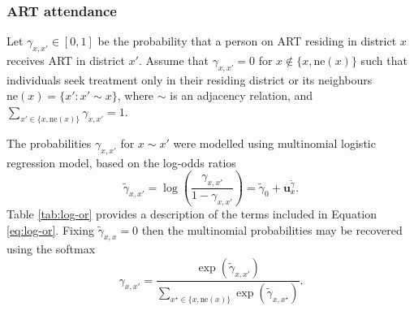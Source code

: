 \documentclass[a4paper, nobind]{templates/ociamthesis}
\begin{document}
\hypertarget{art-attend}{%
\subsubsection{ART attendance}\label{art-attend}}

Let \(\gamma_{x, x'} \in [0, 1]\) be the probability that a person on ART residing in district \(x\) receives ART in district \(x'\).
Assume that \(\gamma_{x, x'} = 0\) for \(x \notin \{x, \text{ne}(x)\}\) such that individuals seek treatment only in their residing district or its neighbours \(\text{ne}(x) = \{x': x' \sim x\}\), where \(\sim\) is an adjacency relation, and \(\sum_{x' \in \{x, \text{ne}(x)\}} \gamma_{x, x'} = 1\).

The probabilities \(\gamma_{x, x'}\) for \(x \sim x'\) were modelled using multinomial logistic regression model, based on the log-odds ratios
\begin{equation}
\tilde \gamma_{x, x'} = \log \left( \frac{\gamma_{x, x'}}{1 - \gamma_{x, x'}} \right) = \tilde \gamma_0 + \mathbf{u}_x^{\tilde \gamma}. \label{eq:log-or}
\end{equation}
Table \ref{tab:log-or} provides a description of the terms included in Equation \eqref{eq:log-or}.
Fixing \(\tilde \gamma_{x, x} = 0\) then the multinomial probabilities may be recovered using the softmax
\begin{equation}
\gamma_{x, x'} = \frac{\exp(\tilde \gamma_{x, x'})}{\sum_{x^\star \in \{x, \text{ne}(x)\}} \exp(\tilde \gamma_{x, x^\star})}.
\end{equation}
\end{document}
